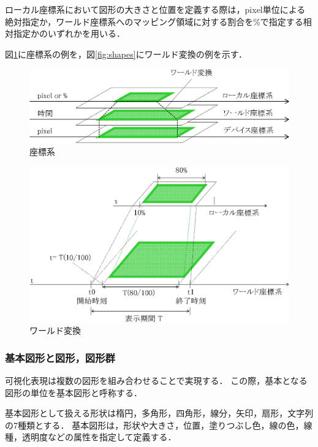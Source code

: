 ローカル座標系において図形の大きさと位置を定義する際は，pixel単位による絶対指定か，ワールド座標系へのマッピング領域に対する割合を\%で指定する相対指定かのいずれかを用いる．

図\ref{fig:coordinate}に座標系の例を，図\ref{fig:shapes}にワールド変換の例を示す．

\begin{figure}[p]
\begin{center}
\includegraphics[scale=0.75]{img/coordinate.eps}
\caption{座標系}
\label{fig:coordinate}
\end{center}
\end{figure}

\begin{figure}[p]
\begin{center}
\includegraphics[scale=0.75]{img/worldTransform.eps}
\caption{ワールド変換}
\label{fig:worldTransform}
\end{center}
\end{figure}

\subsubsection{基本図形と図形，図形群}
可視化表現は複数の図形を組み合わせることで実現する．
この際，基本となる図形の単位を基本図形と呼称する．

基本図形として扱える形状は楕円，多角形，四角形，線分，矢印，扇形，文字列の7種類とする．
基本図形は，形状や大きさ，位置，塗りつぶし色，線の色，線種，透明度などの属性を指定して定義する．

